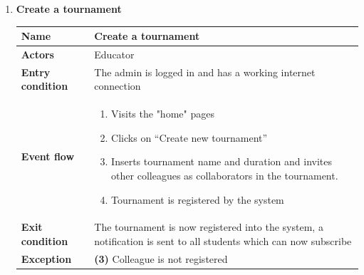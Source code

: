 \documentclass{article}
\begin{document}
\begin{enumerate}[label=\textbf{UC\arabic*}:]
    \item \textbf{Create a tournament}
    \begin{center}
        \begin{tabular}{ | m{8em} | m{10cm}|  } 
            \hline 
            \textbf{Name} & Create a tournament\\[1ex] 
            \hline 
            \textbf{Actors} & Educator \\[1ex] 
            \hline 
            \textbf{Entry condition} & The admin is logged in and has a working internet connection  \\[1ex] 
            \hline 
            \textbf{Event flow} & \begin{enumerate}[label=\textbf{\arabic*}:]
                \item Visits the "home" pages
                \item Clicks on “Create new tournament”
                \item Inserts tournament name and duration and invites other colleagues as collaborators in the tournament.
                \item Tournament is registered by the system
            \end{enumerate} \\[1ex]
            \hline 
            \textbf{Exit condition} & The tournament is now registered into the system, a notification is sent to all students which can now subscribe  \\[1ex]
            \hline 
            \textbf{Exception} & \textbf{(3)} Colleague is not registered \\[1ex]
            \hline 
        \end{tabular}
    \end{center}
       


\end{enumerate}
\end{document}
